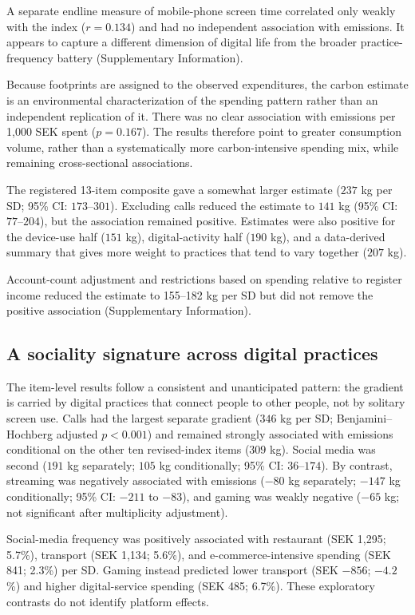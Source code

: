 \documentclass[11pt,a4paper]{article}
\begin{document}
A separate endline measure of mobile-phone screen time correlated only weakly
with the index ($r=0.134$) and had no independent association with emissions.
It appears to capture a different dimension of digital life from the broader
practice-frequency battery (Supplementary Information).

Because footprints are assigned to the observed expenditures, the carbon
estimate is an environmental characterization of the spending pattern rather
than an independent replication of it. There was no clear association with
emissions per 1,000 SEK spent ($p=0.167$). The results therefore point to
greater consumption volume, rather than a systematically more carbon-intensive
spending mix, while remaining cross-sectional associations.

The registered 13-item composite gave a somewhat larger estimate ($237$ kg per SD;
95\% CI: $173$--$301$). Excluding calls reduced the estimate to $141$ kg
(95\% CI: $77$--$204$), but the association remained positive. Estimates were
also positive for the device-use half ($151$ kg), digital-activity half
($190$ kg), and a data-derived summary that gives more weight to practices that
tend to vary together ($207$ kg).

Account-count adjustment and restrictions based on spending relative to
register income reduced the estimate to 155--182 kg per SD but did not remove
the positive association (Supplementary Information).

\subsection{A sociality signature across digital practices}
The item-level results follow a consistent and unanticipated pattern: the
gradient is carried by digital practices that connect people to other people,
not by solitary screen use. Calls had the largest separate gradient ($346$ kg
per SD; Benjamini--Hochberg adjusted $p<0.001$) and remained strongly
associated with emissions conditional on the other ten revised-index items
($309$ kg). Social media was second ($191$ kg separately; $105$ kg
conditionally; 95\% CI: $36$--$174$). By contrast, streaming was negatively
associated with emissions ($-80$ kg separately; $-147$ kg conditionally;
95\% CI: $-211$ to $-83$), and gaming was weakly negative ($-65$ kg; not
significant after multiplicity adjustment).

Social-media frequency was positively associated with restaurant (SEK 1,295;
5.7\%), transport (SEK 1,134; 5.6\%), and e-commerce-intensive spending
(SEK 841; 2.3\%) per SD. Gaming instead predicted lower transport
(SEK $-856$; $-4.2$\%) and higher digital-service spending (SEK 485; 6.7\%).
These exploratory contrasts do not identify platform effects.
\end{document}
